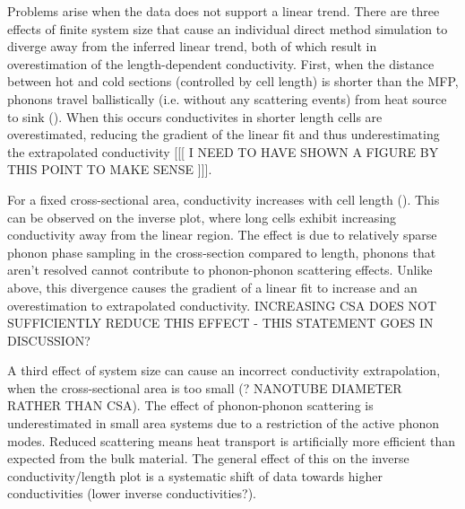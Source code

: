 \documentclass[%
preprint,                                  %
nofootinbib,
 amsmath,amssymb,
 aps,
]{revtex4-1}
\begin{document}

Problems arise when the data does not support a linear trend. There are three effects of finite system size that cause an individual direct method simulation to diverge away from the inferred linear trend, both of which result in overestimation of the length-dependent conductivity. First, when the distance between hot and cold sections (controlled by cell length) is shorter than the MFP, phonons travel ballistically (i.e. without any scattering events) from heat source to sink (\citet{Sellan2010}). When this occurs conductivites in shorter length cells are overestimated, reducing the gradient of the linear fit and thus underestimating the extrapolated conductivity [[[ I NEED TO HAVE SHOWN A FIGURE BY THIS POINT TO MAKE SENSE ]]].

For a fixed cross-sectional area, conductivity increases with cell length (\cite{Hu2011}). This can be observed on the inverse plot, where long cells exhibit increasing conductivity away from the linear region. The effect is due to relatively sparse phonon phase sampling in the cross-section compared to length, phonons that aren't resolved cannot contribute to phonon-phonon scattering effects. Unlike above, this divergence causes the gradient of a linear fit to increase and an overestimation to extrapolated conductivity. INCREASING CSA DOES NOT SUFFICIENTLY REDUCE THIS EFFECT - THIS STATEMENT GOES IN DISCUSSION?

A third effect of system size can cause an incorrect conductivity extrapolation, when the cross-sectional area is too small (\citet{Thomas2010}? NANOTUBE DIAMETER RATHER THAN CSA). The effect of phonon-phonon scattering is underestimated in small area systems due to a restriction of the active phonon modes. Reduced scattering means heat transport is artificially more efficient than expected from the bulk material. The general effect of this on the inverse conductivity/length plot is a systematic shift of data towards higher conductivities (lower inverse conductivities?). 
\end{document}
